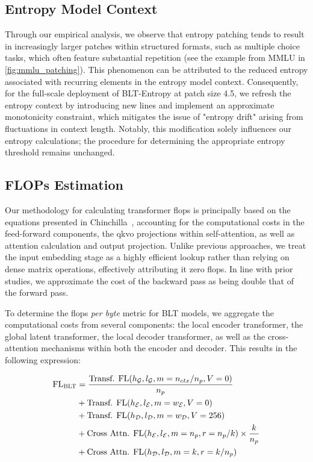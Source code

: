 \subsection{Entropy Model Context}
\label{section:entropy-context}
Through our empirical analysis, we observe that entropy patching tends to result in increasingly larger patches within structured formats, such as multiple choice tasks, which often feature substantial repetition (see the example from MMLU in \autoref{fig:mmlu_patching}). This phenomenon can be attributed to the reduced entropy associated with recurring elements in the entropy model context. Consequently, for the full-scale deployment of {\textsc BLT}-Entropy at patch size 4.5, we refresh the entropy context by introducing new lines and implement an approximate monotonicity constraint, which mitigates the issue of "entropy drift" arising from fluctuations in context length. Notably, this modification solely influences our entropy calculations; the procedure for determining the appropriate entropy threshold remains unchanged.

\subsection{FLOPs Estimation} 
\label{section:flops}

Our methodology for calculating transformer flops is principally based on the equations presented in Chinchilla~\citep{hoffmann2022training}, accounting for the computational costs in the feed-forward components, the qkvo projections within self-attention, as well as attention calculation and output projection. Unlike previous approaches, we treat the input embedding stage as a highly efficient lookup rather than relying on dense matrix operations, effectively attributing it zero flops. In line with prior studies, we approximate the cost of the backward pass as being double that of the forward pass.

To determine the flops \textit{per byte} metric for {\textsc BLT} models, we aggregate the computational costs from several components: the local encoder transformer, the global latent transformer, the local decoder transformer, as well as the cross-attention mechanisms within both the encoder and decoder. This results in the following expression:

\begin{align}
    \text{FL}_{\text{{\textsc BLT}}} &= \frac{\text{Transf. FL}(h_{\mathcal{G}}, l_{\mathcal{G}}, m=n_{ctx}/n_p, V=0)}{n_p}\\
   &+\text{Transf. FL}(h_{\mathcal{E}}, l_{\mathcal{E}}, m=w_{\mathcal{E}}, V=0) \\
   &+ \text{Transf. FL}(h_{\mathcal{D}}, l_{\mathcal{D}}, m=w_{\mathcal{D}}, V=256) \\ 
    &+ \text{Cross Attn. FL}(h_{\mathcal{E}}, l_{\mathcal{E}}, m=n_p, r=n_p/k) \times \frac{k}{n_p}\\ 
   &+ \text{Cross Attn. FL}(h_{\mathcal{D}}, l_{\mathcal{D}}, m=k, r=k/n_p) 
\end{align}

